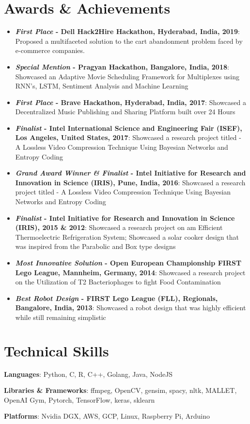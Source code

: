 \documentclass[letterpaper,11pt]{article}
\newcommand{\resumeItem}[2]{
    \item\small{
        \textbf{#1}{: #2 \vspace{-2pt}}
    }
}
\newcommand{\resumeSubItem}[2]{\resumeItem{#1}{#2}\vspace{-4pt}}
\newcommand{\resumeSubHeadingListStart}{\begin{itemize}[leftmargin=*]}
\newcommand{\resumeSubHeadingListEnd}{\end{itemize}}
\begin{document}
\section{Awards \& Achievements}
    \resumeSubHeadingListStart
        \resumeSubItem{\textit{First Place} - Dell Hack2Hire Hackathon, Hyderabad, India, 2019}
            {Proposed a multifaceted solution to the cart abandonment problem faced by e-commerce companies.}
        \resumeSubItem{\textit{Special Mention} - Pragyan Hackathon, Bangalore, India, 2018}
            {Showcased an Adaptive Movie Scheduling Framework for Multiplexes using RNN's, LSTM, Sentiment Analysis and Machine Learning}
      \resumeSubItem{\textit{First Place} - Brave Hackathon, Hyderabad, India, 2017}
            {Showcased a Decentralized Music Publishing and Sharing Platform built over 24 Hours}
      \resumeSubItem{\textit{Finalist} - Intel International Science and Engineering Fair (ISEF), Los Angeles, United States, 2017}
            {Showcased a research project titled - A Lossless Video Compression Technique Using Bayesian Networks and Entropy Coding}
      \resumeSubItem{\textit{Grand Award Winner \& Finalist} - Intel Initiative for Research and Innovation in Science (IRIS), Pune, India, 2016}
            {Showcased a research project titled - A Lossless Video Compression Technique Using Bayesian Networks and Entropy Coding}
      \resumeSubItem{\textit{Finalist} - Intel Initiative for Research and Innovation in Science (IRIS), 2015 \& 2012}
            {Showcased a research project on am Efficient Thermoelectric Refrigeration System; Showcased a solar cooker design that was inspired from the Parabolic and Box type designs}
      \resumeSubItem{\textit{Most Innovative Solution} - Open European Championship FIRST Lego League, Mannheim, Germany, 2014}
            {Showcased a research project on the Utilization of T2 Bacteriophages to fight Food Contamination}
      \resumeSubItem{\textit{Best Robot Design} - FIRST Lego League (FLL), Regionals, Bangalore, India, 2013}
            {Showcased a robot design that was highly efficient while still remaining simplistic}
    \resumeSubHeadingListEnd

\section{Technical Skills}
  \resumeSubHeadingListStart
    \item{\textbf{Languages}{: Python, C, R, C++, Golang, Java, NodeJS}
    \item{\textbf{Libraries \& Frameworks}{: ffmpeg, OpenCV, gensim, spacy, nltk, MALLET, OpenAI Gym, Pytorch, TensorFlow, keras, sklearn}}
    \item{\textbf{Platforms}{: Nvidia DGX, AWS, GCP, Linux, Raspberry Pi, Arduino}}}
  \resumeSubHeadingListEnd
\end{document}
